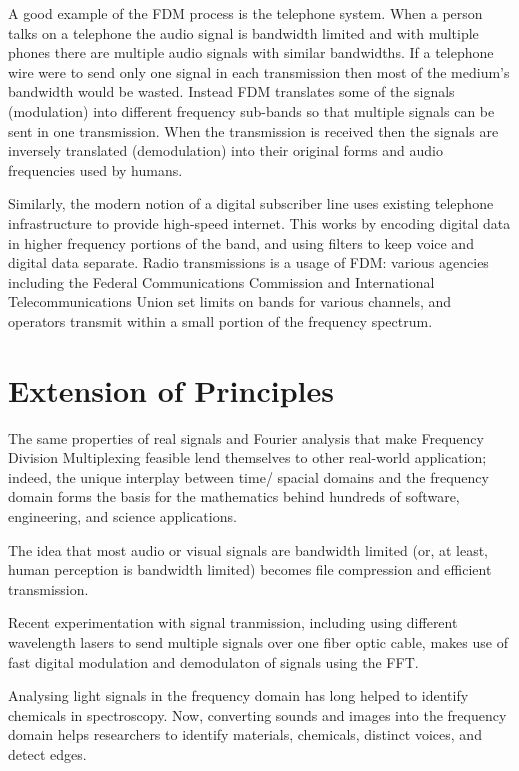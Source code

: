 \documentclass[12pt]{article}
\begin{document}
A good example of the FDM process is the telephone system. When a person talks
on a telephone the audio signal is bandwidth limited and with multiple phones
there are multiple audio signals with similar bandwidths. If a telephone
wire were to send only one signal in each transmission then most of the
medium’s bandwidth would be wasted. Instead FDM translates some of the signals
(modulation) into different frequency sub-bands so that multiple signals can be
sent in one transmission. When the transmission is received then the signals
are inversely translated (demodulation) into their original forms and audio
frequencies used by humans.

Similarly, the modern notion of a digital subscriber line uses existing
telephone infrastructure to provide high-speed internet. This works by encoding
digital data in higher frequency portions of the band, and using filters to
keep voice and digital data separate. Radio transmissions is
a usage of FDM: various agencies including the Federal Communications Commission
and International Telecommunications Union set limits on bands for various
channels, and operators transmit within a small portion of the frequency spectrum.

\clearpage
\section{Extension of Principles}

The same properties of real signals and Fourier analysis that make Frequency 
Division Multiplexing feasible lend themselves to other real-world application;
indeed, the unique interplay between time/ spacial domains and the frequency
domain forms the basis for the mathematics behind hundreds of software, engineering,
and science applications.

The idea that most audio or visual signals are bandwidth limited (or, at least,
human perception is bandwidth limited) becomes file compression and efficient
transmission. 

Recent experimentation with signal tranmission, including using 
different wavelength lasers to send multiple signals over one fiber optic cable,
makes use of fast digital modulation and demodulaton of signals using the FFT.

Analysing light signals in the frequency domain has long helped to identify 
chemicals in spectroscopy. Now, converting sounds and images into the frequency 
domain helps researchers to identify materials, chemicals, distinct voices, and 
detect edges.
\end{document}
